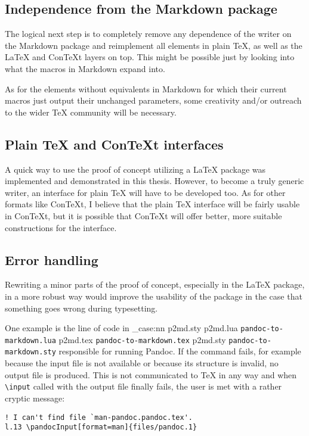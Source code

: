 \documentclass[
  digital,     %
  oneside,     %
  nosansbold,  %
  nocolorbold, %
  lof,         %
  nolot,       %
]{fithesis4}
\newcommand\macro[1]{\texttt{\textbackslash{}{#1}}}
\newcommand\file[1]
  {
    \str_case:nn
      { #1 }
      {
        { p2md.lua } { \texttt{pandoc\hyp{}to\hyp{}markdown.lua} }
        { p2md.tex } { \texttt{pandoc\hyp{}to\hyp{}markdown.tex} }
        { p2md.sty } { \texttt{pandoc\hyp{}to\hyp{}markdown.sty} }
      }
  }
\begin{document}
\subsection{Independence from the Markdown package}
The logical next step is to completely remove any dependence of the writer on the Markdown package and reimplement all elements in plain \TeX{}, as well as the \LaTeX{} and Con\TeX{}t layers on top. This might be possible just by looking into what the macros in Markdown expand into.

As for the elements without equivalents in Markdown for which their current macros just output their unchanged parameters, some creativity and/or outreach to the wider \TeX{} community will be necessary.

\subsection{Plain \TeX{} and Con\TeX{}t interfaces}
A quick way to use the proof of concept utilizing a \LaTeX{} package was implemented and demonstrated in this thesis. However, to become a truly generic writer, an interface for plain \TeX{} will have to be developed too. As for other formats like Con\TeX{}t, I believe that the plain \TeX{} interface will be fairly usable in Con\TeX{}t, but it is possible that Con\TeX{}t will offer better, more suitable constructions for the interface.

\subsection{Error handling}
Rewriting a minor parts of the proof of concept, especially in the \LaTeX{} package, in a more robust way would improve the usability of the package in the case that something goes wrong during typesetting.

One example is the line of code in \file{p2md.sty} responsible for running Pandoc. If the command fails, for example because the input file is not available or because its structure is invalid, no output file is produced. This is not communicated to \TeX{} in any way and when \macro{input} called with the output file finally fails, the user is met with a rather cryptic message:

\noindent
\lstset{language=}
\begin{lstlisting}
! I can't find file `man-pandoc.pandoc.tex'.
l.13 \pandocInput[format=man]{files/pandoc.1}
\end{lstlisting}
\end{document}
